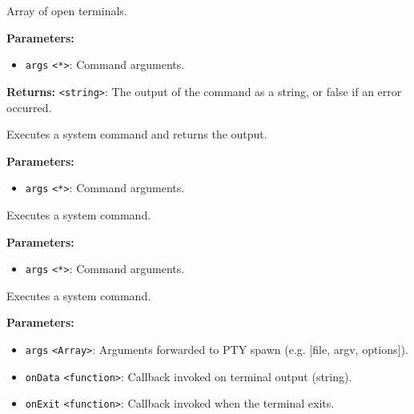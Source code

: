 \documentclass[12pt,a4paper]{article}
\begin{document}
\noindent Array of open terminals.

\vspace{5mm}
\noindent {}


\noindent \textbf{Parameters:}
\begin{itemize}
  \item \texttt{args} \texttt{<*>}: Command arguments.
\end{itemize}

\noindent \textbf{Returns:} \texttt{<string>}: The output of the command as a string, or false if an error occurred.

\noindent Executes a system command and returns the output.

\vspace{5mm}
\noindent {}


\noindent \textbf{Parameters:}
\begin{itemize}
  \item \texttt{args} \texttt{<*>}: Command arguments.
\end{itemize}

\noindent Executes a system command.

\vspace{5mm}
\noindent {}


\noindent \textbf{Parameters:}
\begin{itemize}
  \item \texttt{args} \texttt{<*>}: Command arguments.
\end{itemize}

\noindent Executes a system command.

\vspace{5mm}
\noindent {}


\noindent \textbf{Parameters:}
\begin{itemize}
  \item \texttt{args} \texttt{<Array>}: Arguments forwarded to PTY spawn (e.g. [file, argv, options]).
  \item \texttt{onData} \texttt{<function>}: Callback invoked on terminal output (string).
  \item \texttt{onExit} \texttt{<function>}: Callback invoked when the terminal exits.
\end{itemize}
\end{document}
